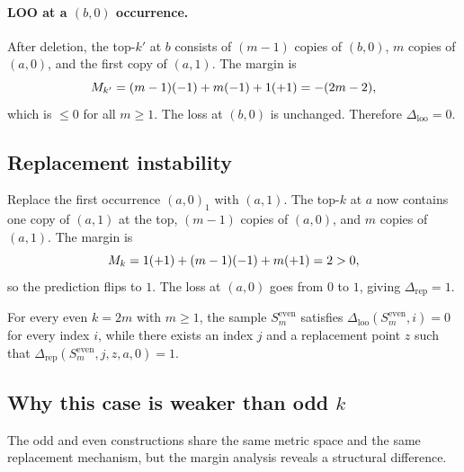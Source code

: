 \paragraph{LOO at a $(b,0)$ occurrence.}
After deletion, the top-$k'$ at $b$ consists of $(m-1)$ copies of $(b,0)$, $m$
copies of $(a,0)$, and the first copy of $(a,1)$.  The margin is
\[
M_{k'} = (m-1)(-1) + m(-1) + 1(+1) = -(2m-2),
\]
which is $\le 0$ for all $m \ge 1$.  The loss at $(b,0)$ is unchanged.
Therefore $\Delta_{\mathrm{loo}} = 0$.

\subsection{Replacement instability}

Replace the first occurrence $(a,0)_1$ with $(a,1)$.  The top-$k$ at $a$ now
contains one copy of $(a,1)$ at the top, $(m-1)$ copies of $(a,0)$, and $m$
copies of $(a,1)$.  The margin is
\[
M_k = 1(+1) + (m-1)(-1) + m(+1) = 2 > 0,
\]
so the prediction flips to $1$.  The loss at $(a,0)$ goes from $0$ to $1$,
giving $\Delta_{\mathrm{rep}} = 1$.

\begin{theorem}
\label{thm:even-k-separation}
For every even $k = 2m$ with $m \ge 1$, the sample $S_m^{\text{even}}$
satisfies $\Delta_{\mathrm{loo}}(S_m^{\text{even}}, i) = 0$ for every index
$i$, while there exists an index $j$ and a replacement point $z$ such that
$\Delta_{\mathrm{rep}}(S_m^{\text{even}}, j, z, a, 0) = 1$.
\end{theorem}

\subsection{Why this case is weaker than odd $k$}

The odd and even constructions share the same metric space and the same
replacement mechanism, but the margin analysis reveals a structural difference.

